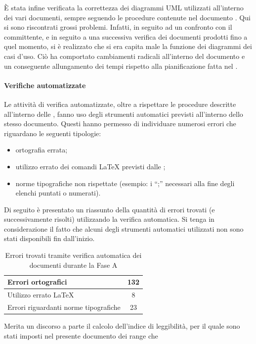 				È stata infine verificata la correttezza dei diagrammi UML utilizzati all'interno dei vari documenti, sempre seguendo le procedure 
				contenute nel documento . Qui si sono riscontrati grossi problemi. Infatti, in seguito ad un confronto con il 
				committente, e in seguito a una successiva verifica dei documenti prodotti fino a quel momento, si è realizzato che si era capita male 
				la funzione dei diagrammi dei casi d'uso. Ciò ha comportato cambiamenti radicali all'interno del documento  
				e un conseguente allungamento dei tempi rispetto alla pianificazione fatta nel .
			\paragraph{Verifiche automatizzate}
				Le attività di verifica automatizzate, oltre a rispettare le procedure descritte all'interno delle , fanno uso 
				degli strumenti automatici previsti all'interno dello stesso documento. Questi hanno permesso di individuare numerosi errori che 
				riguardano le seguenti tipologie:
				\begin{itemize}
					\item ortografia errata;
					\item utilizzo errato dei comandi \LaTeX{} previsti dalle ;
					\item norme tipografiche non rispettate (esempio: i “;” necessari alla fine degli elenchi puntati o numerati).
				\end{itemize}
				Di seguito è presentato un riassunto della quantità di errori trovati (e successivamente risolti) utilizzando la verifica automatica. Si 
				tenga in considerazione il fatto che alcuni degli strumenti automatici utilizzati non sono stati disponibili fin dall'inizio.
				\begin{table}[H]
					\centering
					\begin{tabu}{| l | c |}
						\hline
						Errori ortografici	&132	\\ \hline
						Utilizzo errato \LaTeX{}	&8	\\ \hline
						Errori riguardanti norme tipografiche	&23	\\ \hline
					\end{tabu}
					\caption{Errori trovati tramite verifica automatica dei documenti durante la Fase A}
				\end{table}
				Merita un discorso a parte il calcolo dell'indice di leggibilità, per il quale sono stati imposti nel presente documento dei range che 
